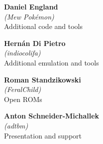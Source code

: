 \begin{mega65thanks}
\begin{minipage}{\linewidth}
    {\large\bf Daniel England} \\
    \textit{(Mew Pokémon)} \\
    Additional code and tools
\end{minipage}

\begin{minipage}{\linewidth}
    {\large\bf Hernán Di Pietro} \\
    \textit{(indiocolifa)} \\
    Additional emulation and tools
\end{minipage}

\begin{minipage}{\linewidth}
    {\large\bf Roman Standzikowski} \\
    \textit{(FeralChild)} \\
    Open ROMs
\end{minipage}

\begin{minipage}{\linewidth}
    {\large\bf Anton Schneider-Michallek} \\
    \textit{(adtbm)} \\
    Presentation and support
\end{minipage}

\end{mega65thanks}
